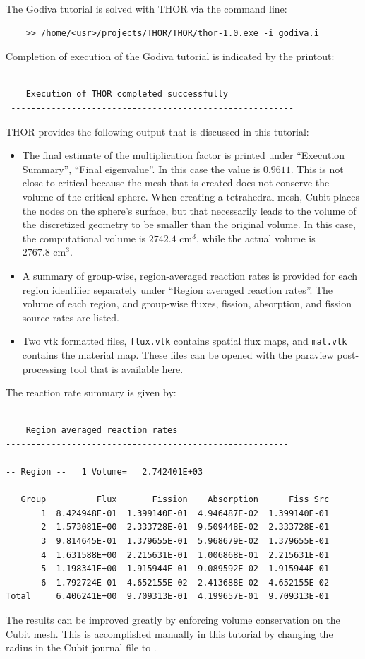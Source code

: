 The Godiva tutorial is solved with THOR via the command line:
\begin{verbatim}
    >> /home/<usr>/projects/THOR/THOR/thor-1.0.exe -i godiva.i
\end{verbatim}

Completion of execution of the Godiva tutorial is indicated by the printout:
\begin{verbatim}
--------------------------------------------------------
    Execution of THOR completed successfully
 --------------------------------------------------------
\end{verbatim}

THOR provides the following output that is discussed in this tutorial:
\begin{itemize}
    \item The final estimate of the multiplication factor is printed under ``Execution Summary'', ``Final eigenvalue''. In this case the value is $0.9611$. This is not close to critical because the mesh that
    is created does not conserve the volume of the critical sphere. When creating a tetrahedral mesh,
    Cubit places the nodes on the sphere's surface, but that necessarily leads to the volume of the discretized geometry to be smaller than the original volume. In this case, the computational volume
    is $2742.4\text{ cm}^3$, while the actual volume is $2767.8\text{ cm}^3$.
    \item A summary of group-wise, region-averaged reaction rates is provided for each region identifier separately under ``Region averaged reaction rates''. The volume of each region, and group-wise fluxes, fission, absorption, and fission source rates are listed.
    \item Two vtk formatted files, \verb"flux.vtk" contains spatial flux maps, and \verb"mat.vtk" contains the material map. These files can be opened with the paraview post-processing tool that is available \href{https://www.paraview.org/download/}{here}.
\end{itemize}

The reaction rate summary is given by:
\begin{verbatim}
--------------------------------------------------------
    Region averaged reaction rates
--------------------------------------------------------

-- Region --   1 Volume=   2.742401E+03

   Group          Flux       Fission    Absorption      Fiss Src
       1  8.424948E-01  1.399140E-01  4.946487E-02  1.399140E-01
       2  1.573081E+00  2.333728E-01  9.509448E-02  2.333728E-01
       3  9.814645E-01  1.379655E-01  5.968679E-02  1.379655E-01
       4  1.631588E+00  2.215631E-01  1.006868E-01  2.215631E-01
       5  1.198341E+00  1.915944E-01  9.089592E-02  1.915944E-01
       6  1.792724E-01  4.652155E-02  2.413688E-02  4.652155E-02
Total     6.406241E+00  9.709313E-01  4.199657E-01  9.709313E-01
\end{verbatim}

The results can be improved greatly by enforcing volume conservation on the Cubit mesh. This is accomplished manually in this tutorial by changing the radius in the Cubit journal file to .